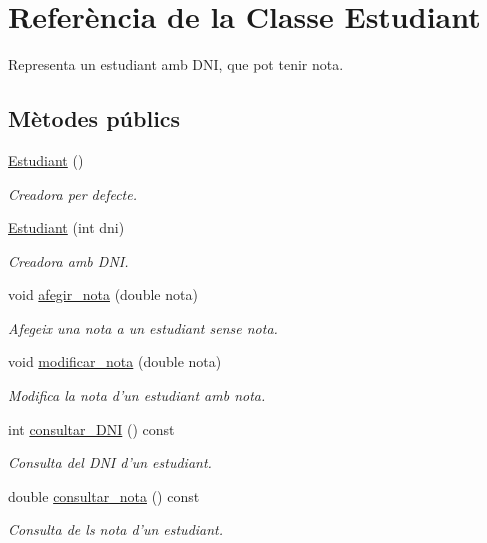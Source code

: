 \hypertarget{class_estudiant}{\section{Referència de la Classe Estudiant}
\label{class_estudiant}
}


Representa un estudiant amb D\+N\+I, que pot tenir nota.  


\subsection*{Mètodes públics}
\begin{DoxyCompactItemize}
\item 
\hyperlink{class_estudiant_a88f7f46dd946fef9f7a71fdc608afd16}{Estudiant} ()
\begin{DoxyCompactList}\small\item\em Creadora per defecte. \end{DoxyCompactList}\item 
\hyperlink{class_estudiant_ae0a9ebffe2ff8fb6cecc15a909206a1b}{Estudiant} (int dni)
\begin{DoxyCompactList}\small\item\em Creadora amb D\+N\+I. \end{DoxyCompactList}\item 
void \hyperlink{class_estudiant_a8a2186560dce4ccfc5922d2c98f21305}{afegir\+\_\+nota} (double nota)
\begin{DoxyCompactList}\small\item\em Afegeix una nota a un estudiant sense nota. \end{DoxyCompactList}\item 
void \hyperlink{class_estudiant_a5d5eded678c16a864f22477d401a56af}{modificar\+\_\+nota} (double nota)
\begin{DoxyCompactList}\small\item\em Modifica la nota d'un estudiant amb nota. \end{DoxyCompactList}\item 
int \hyperlink{class_estudiant_a5b292568ec470cb27bf41a0f097341f1}{consultar\+\_\+\+D\+N\+I} () const 
\begin{DoxyCompactList}\small\item\em Consulta del D\+N\+I d'un estudiant. \end{DoxyCompactList}\item 
double \hyperlink{class_estudiant_a0f5562a2dd1d17bac9671fe2caf2dbf7}{consultar\+\_\+nota} () const 
\begin{DoxyCompactList}\small\item\em Consulta de ls nota d'un estudiant. \end{DoxyCompactList}\item 

\end{DoxyCompactItemize}

